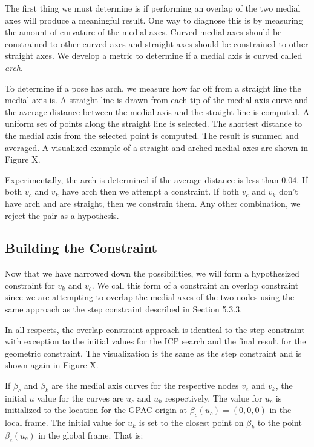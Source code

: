 The first thing we must determine is if performing an overlap of the two medial axes will produce a meaningful result.  One way to diagnose this is by measuring the amount of curvature of the medial axes.  Curved medial axes should be constrained to other curved axes and straight axes should be constrained to other straight axes.  We develop a metric to determine if a medial axis is curved called \emph{arch}.

To determine if a pose has arch, we measure how far off from a straight line the medial axis is.  A straight line is drawn from each tip of the medial axis curve and the average distance between the medial axis and the straight line is computed.  A uniform set of points along the straight line is selected.  The shortest distance to the medial axis from the selected point is computed.   The result is summed and averaged.  A visualized example of a straight and arched medial axes are shown in Figure X.

Experimentally, the arch is determined if the average distance is less than $0.04$.  If both $v_c$ and $v_k$ have arch then we attempt a constraint.  If both $v_c$ and $v_k$ don't have arch and are straight, then we constrain them.  Any other combination, we reject the pair as a hypothesis.

\subsection{Building the Constraint}

Now that we have narrowed down the possibilities, we will form a hypothesized constraint for $v_k$ and $v_c$.  We call this form of a constraint an overlap constraint since we are attempting to overlap the medial axes of the two nodes using the same approach as the step constraint described in Section 5.3.3. 

In all respects, the overlap constraint approach is identical to the step constraint with exception to the initial values for the ICP search and the final result for the geometric constraint.  The visualization is the same as the step constraint and is shown again in Figure X.

If $\beta_c$ and $\beta_k$ are the medial axis curves for the respective nodes $v_c$ and $v_k$, the initial $u$ value for the curves are $u_c$ and $u_k$ respectively.  The value for $u_c$ is initialized to the location for the GPAC origin at $\beta_c(u_c) = (0,0,0)$ in the local frame.  The initial value for $u_k$ is set to the closest point on $\beta_k$ to the point $\beta_c(u_c)$ in the global frame.  That is:

